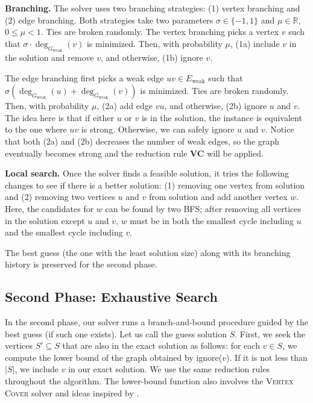 \documentclass[a4paper,UKenglish,cleveref, autoref, thm-restate]{lipics-v2021}
\begin{document}
\textbf{Branching.} The solver uses two branching strategies: (1) vertex branching and (2) edge branching.
Both strategies take two parameters $\sigma \in \{-1,1\}$ and $\mu \in \mathbb{R}$, $0 \leq \mu < 1$.
Ties are broken randomly.
%
The vertex branching picks a vertex $v$ such that $\sigma \cdot \deg_{G_\text{weak}}(v)$ is minimized.
Then, with probability $\mu$, (1a) include $v$ in the solution and remove $v$, and otherwise, (1b) ignore $v$.

The edge branching first picks a weak edge $uv \in E_\text{weak}$ such that
 $\sigma (\deg_{G_\text{weak}}(u) + \deg_{G_\text{weak}}(v))$ is minimized.
 Ties are broken randomly.
Then, with probability $\mu$, (2a) add edge $vu$, and otherwise, (2b) ignore $u$ and $v$.
%
The idea here is that if either $u$ or $v$ is in the solution, the instance is equivalent to the one where
$uv$ is strong.
Otherwise, we can safely ignore $u$ and $v$.
Notice that both (2a) and (2b) decreases the number of weak edges,
 so the graph eventually becomes strong and the reduction rule \textbf{VC} will be applied.

\textbf{Local search.} Once the solver finds a feasible solution,
 it tries the following changes to see if there is a better solution:
 (1) removing one vertex from solution and
 (2) removing two vertices $u$ and $v$ from solution and add another vertex $w$.
%
Here, the candidates for $w$ can be found by two BFS;
 after removing all vertices in the solution except $u$ and $v$,
 $w$ must be in both the smallest cycle including $u$ and the smallest cycle including $v$.

\vspace*{1em}

The best guess (the one with the least solution size) along with its branching history
 is preserved for the second phase.


\subsection{Second Phase: Exhaustive Search}

In the second phase, our solver runs a branch-and-bound procedure guided by the best guess (if such one exists).
%
Let us call the guess solution $S$.
First, we seek the vertices $S' \subseteq S$ that are also in the exact solution as follows:
for each $v \in S$, we compute the lower bound of the graph obtained by \textsf{ignore}($v$).
If it is not less than $|S|$, we include $v$ in our exact solution.
We use the same reduction rules throughout the algorithm.
The lower-bound function also involves the \textsc{Vertex Cover} solver and
 ideas inspired by \cite{hen-ming_lin_computing_2000}.
\end{document}
